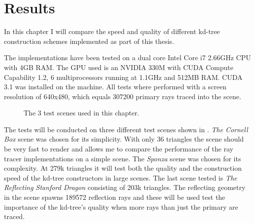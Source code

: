 
\chapter{Results}\label{chp:results}



In this chapter I will compare the speed and quality of different kd-tree
construction schemes implemented as part of this thesis.


The implementations have been tested on a dual core Intel Core i7 2.66GHz CPU
with 4GB RAM. The GPU used is an NVIDIA 330M with CUDA Compute Capability 1.2, 6
multiprocessors running at 1.1GHz and 512MB RAM. CUDA 3.1 was installed on the
machine. All tests where performed with a screen resolution of 640x480, which
equals 307200 primary rays traced into the scene.

\begin{figure}
  \centering
  \caption[Test scenes.]{The 3 test scenes used in this chapter.}
  \label{fig:testScenes}
\end{figure}


The tests will be conducted on three different test scenes shown in
. \textit{The Cornell Box} scene was chosen for its
simplicity. With only 36 triangles the scene should be very fast to render and
allows me to compare the performance of the ray tracer implementations on a
simple scene. The \textit{Sponza} scene was chosen for its complexity. At 279k
triangles it will test both the quality and the construction speed of the
kd-tree constructors in large scenes. The last scene tested is \textit{The
  Reflecting Stanford Dragon} consisting of 203k triangles. The reflecting
geometry in the scene spawns 189572 reflection rays and these will be used test
the importance of the kd-tree's quality when more rays than just the primary are
traced.

